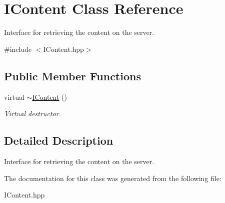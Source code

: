 \hypertarget{class_i_content}{}\section{I\+Content Class Reference}
\label{class_i_content}


Interface for retrieving the content on the server.  




{\ttfamily \#include $<$I\+Content.\+hpp$>$}

\subsection*{Public Member Functions}
\begin{DoxyCompactItemize}
\item 
\hypertarget{class_i_content_a7804cb902e263b84dc55a357ef9661b9}{}virtual \hyperlink{class_i_content_a7804cb902e263b84dc55a357ef9661b9}{$\sim$\+I\+Content} ()\label{class_i_content_a7804cb902e263b84dc55a357ef9661b9}

\begin{DoxyCompactList}\small\item\em Virtual destructor. \end{DoxyCompactList}\end{DoxyCompactItemize}


\subsection{Detailed Description}
Interface for retrieving the content on the server. 

The documentation for this class was generated from the following file\+:\begin{DoxyCompactItemize}
\item 
I\+Content.\+hpp\end{DoxyCompactItemize}
